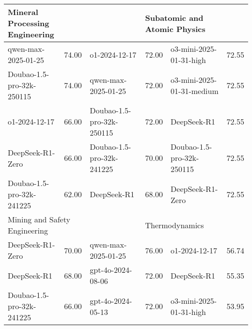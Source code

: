 {\begin{longtable}{p{4.2cm}>{\centering\arraybackslash} p{0.8cm}|p{4.2cm} >{\centering\arraybackslash} p{0.8cm}|p{4.2cm} >{\centering\arraybackslash} p{0.8cm}}
\hline
\multicolumn{2}{p{5.15cm}|}{\cellcolor{blue!10} \centering Mineral Processing Engineering} & \multicolumn{2}{p{5.15cm}|}{\cellcolor{yellow!10} \centering Pediatrics} & \multicolumn{2}{p{5.15cm}}{\cellcolor{green!10} \centering Subatomic and Atomic Physics}\\
\hline
\cellcolor{blue!5} qwen-max-2025-01-25 & \cellcolor{blue!2}74.00 & \cellcolor{yellow!5} o1-2024-12-17 & \cellcolor{yellow!2} 72.00 & \cellcolor{green!5} o3-mini-2025-01-31-high & \cellcolor{green!2} 72.55\\
\cellcolor{blue!5} Doubao-1.5-pro-32k-250115 & \cellcolor{blue!2}74.00 & \cellcolor{yellow!5} qwen-max-2025-01-25 & \cellcolor{yellow!2} 72.00 & \cellcolor{green!5} o3-mini-2025-01-31-medium & \cellcolor{green!2} 72.55\\
\cellcolor{blue!5} o1-2024-12-17 & \cellcolor{blue!2}66.00 & \cellcolor{yellow!5} Doubao-1.5-pro-32k-250115 & \cellcolor{yellow!2} 72.00 & \cellcolor{green!5} DeepSeek-R1 & \cellcolor{green!2} 72.55\\
\cellcolor{blue!5} DeepSeek-R1-Zero & \cellcolor{blue!2}66.00 & \cellcolor{yellow!5} Doubao-1.5-pro-32k-241225 & \cellcolor{yellow!2} 70.00 & \cellcolor{green!5} Doubao-1.5-pro-32k-250115 & \cellcolor{green!2} 72.55\\
\cellcolor{blue!5} Doubao-1.5-pro-32k-241225 & \cellcolor{blue!2}62.00 & \cellcolor{yellow!5} DeepSeek-R1 & \cellcolor{yellow!2} 68.00 & \cellcolor{green!5} DeepSeek-R1-Zero & \cellcolor{green!2} 72.55\\
\hline
\multicolumn{2}{p{5.15cm}|}{\cellcolor{blue!10} \centering Mining and Safety Engineering} & \multicolumn{2}{p{5.15cm}|}{\cellcolor{yellow!10} \centering Psychiatry and Mental Health} & \multicolumn{2}{p{5.15cm}}{\cellcolor{green!10} \centering Thermodynamics}\\
\hline
\cellcolor{blue!5} DeepSeek-R1-Zero & \cellcolor{blue!2}70.00 & \cellcolor{yellow!5} qwen-max-2025-01-25 & \cellcolor{yellow!2} 76.00 & \cellcolor{green!5} o1-2024-12-17 & \cellcolor{green!2} 56.74\\
\cellcolor{blue!5} DeepSeek-R1 & \cellcolor{blue!2}68.00 & \cellcolor{yellow!5} gpt-4o-2024-08-06 & \cellcolor{yellow!2} 72.00 & \cellcolor{green!5} DeepSeek-R1 & \cellcolor{green!2} 55.35\\
\cellcolor{blue!5} Doubao-1.5-pro-32k-241225 & \cellcolor{blue!2}66.00 & \cellcolor{yellow!5} gpt-4o-2024-05-13 & \cellcolor{yellow!2} 72.00 & \cellcolor{green!5} o3-mini-2025-01-31-high & \cellcolor{green!2} 53.95\\

\end{longtable}}
